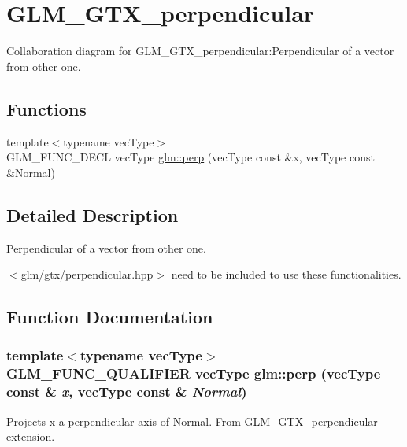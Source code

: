 \hypertarget{group__gtx__perpendicular}{
\section{GLM\_\-GTX\_\-perpendicular}
\label{group__gtx__perpendicular}
}


Collaboration diagram for GLM\_\-GTX\_\-perpendicular:Perpendicular of a vector from other one.  
\subsection*{Functions}
\begin{CompactItemize}
\item 
{\footnotesize template$<$typename vecType$>$ }\\GLM\_\-FUNC\_\-DECL vecType \hyperlink{group__gtx__perpendicular_gcd6201d43400cf027df57552bf92301d}{glm::perp} (vecType const \&x, vecType const \&Normal)
\end{CompactItemize}


\subsection{Detailed Description}
Perpendicular of a vector from other one. 

$<$glm/gtx/perpendicular.hpp$>$ need to be included to use these functionalities. 

\subsection{Function Documentation}
\hypertarget{group__gtx__perpendicular_gcd6201d43400cf027df57552bf92301d}{
\subsubsection[perp]{\setlength{\rightskip}{0pt plus 5cm}template$<$typename vecType$>$ GLM\_\-FUNC\_\-QUALIFIER vecType glm::perp (vecType const \& {\em x}, \/  vecType const \& {\em Normal})}}
\label{group__gtx__perpendicular_gcd6201d43400cf027df57552bf92301d}


Projects x a perpendicular axis of Normal. From GLM\_\-GTX\_\-perpendicular extension. 